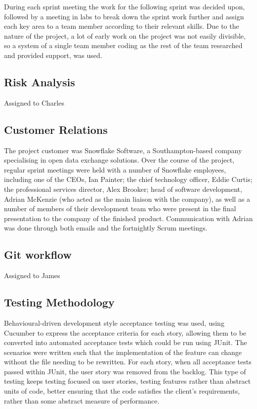 \documentclass[a4paper, 12pt, twoside]{article}
\begin{document}
During each sprint meeting the work for the following sprint was decided upon, followed by a meeting in labs to break down the sprint work further and assign each key area to a team member according to their relevant skills. Due to the nature of the project, a lot of early work on the project was not easily divisible, so a system of a single team member coding as the rest of the team researched and provided support, was used.

\subsection{Risk Analysis}
\label{sec:plan_risk_analysis}

Assigned to Charles

\subsection{Customer Relations}
\label{sec:plan_customer_relations}

The project customer was Snowflake Software, a Southampton-based company specialising in open data exchange solutions. Over the course of the project, regular sprint meetings were held with a number of Snowflake employees, including one of the CEOs, Ian Painter; the chief technology officer, Eddie Curtis; the professional services director, Alex Brooker; head of software development, Adrian McKenzie (who acted as the main liaison with the company), as well as a number of members of their development team who were present in the final presentation to the company of the finished product. Communication with Adrian was done through both emails and the fortnightly Scrum meetings.

\subsection{Git workflow}
\label{sec:plan_git_workflow}

Assigned to James

\subsection{Testing Methodology}
\label{sec:plan_testing_methodology}

Behavioural-driven development style acceptance testing was used, using Cucumber to express the acceptance criteria for each story, allowing them to be converted into automated acceptance tests which could be run using JUnit. The scenarios were written such that the implementation of the feature can change without the file needing to be rewritten. For each story, when all acceptance tests passed within JUnit, the user story was removed from the backlog. This type of testing keeps testing focused on user stories, testing features rather than abstract units of code, better ensuring that the code satisfies the client's requirements, rather than some abstract measure of performance.
\end{document}
